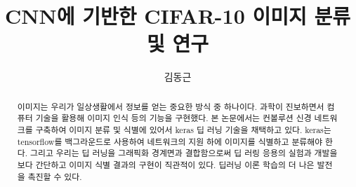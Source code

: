 \documentclass{article}
\title{CNN에 기반한 CIFAR-10 이미지 분류 및 연구}
\author{김동근}
\date{}
\begin{document}
\maketitle

\begin{abstract}
    이미지는 우리가 일상생활에서 정보를 얻는 중요한 방식 중 하나이다. 과학이 진보하면서 컴퓨터 기술을 활용해 이미지 인식 등의 기능을 구현했다. 본 논문에서는 컨볼루션 신경 네트워크를 구축하여 이미지 분류 및 식별에 있어서 keras 딥 러닝 기술을 채택하고 있다. keras는 tensorflow를 백그라운드로 사용하여 네트워크의 지원 하에 이미지를 식별하고 분류해야 한다. 그리고 우리는 딥 러닝을 그래픽화 경계면과 결합함으로써 딥 러링 응용의 실험과 개발을 보다 간단하고 이미지 식별 결과의 구현이 직관적이 있다. 딥러닝 이론 학습의 더 나은 발전을 촉진할 수 있다.
\end{abstract}










\end{document}
